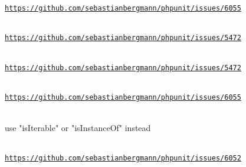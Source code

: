 \begin{DoxyRefList}
\label{deprecated__deprecated000288}%
%
\href{https://github.com/sebastianbergmann/phpunit/issues/6055}{\texttt{https\+://github.\+com/sebastianbergmann/phpunit/issues/6055}}  
\item[Global \doxylink{class_p_h_p_unit_1_1_framework_1_1_assert_a60343b0763f808380a0d6ae669ede96e}{Assert\+::assert\+String\+Not\+Matches\+Format} (string \$format, string \$string, string \$message=\textquotesingle{}\textquotesingle{})]\hfill \\
\label{deprecated__deprecated000289}%
%
\href{https://github.com/sebastianbergmann/phpunit/issues/5472}{\texttt{https\+://github.\+com/sebastianbergmann/phpunit/issues/5472}}  
\item[Global \doxylink{class_p_h_p_unit_1_1_framework_1_1_assert_a2d7501729a15c4a790a9020a15fe5cad}{Assert\+::assert\+String\+Not\+Matches\+Format\+File} (string \$format\+File, string \$string, string \$message=\textquotesingle{}\textquotesingle{})]\hfill \\
\label{deprecated__deprecated000290}%
%
\href{https://github.com/sebastianbergmann/phpunit/issues/5472}{\texttt{https\+://github.\+com/sebastianbergmann/phpunit/issues/5472}}  
\item[Global \doxylink{class_p_h_p_unit_1_1_framework_1_1_assert_a8d25447129d11edcbf91f80c7d82cae2}{Assert\+::contains\+Only} (string \$type)]\hfill \\
\label{deprecated__deprecated000291}%
%
\href{https://github.com/sebastianbergmann/phpunit/issues/6055}{\texttt{https\+://github.\+com/sebastianbergmann/phpunit/issues/6055}}  
\item[Global \doxylink{class_webmozart_1_1_assert_1_1_assert_a3c578fe4df71e6258b16f41ed3c8edc8}{Assert\+::is\+Traversable} (\$value, \$message=\textquotesingle{}\textquotesingle{})]\hfill \\
\label{deprecated__deprecated000443}%
%
use "{}is\+Iterable"{} or "{}is\+Instance\+Of"{} instead 
\item[Global \doxylink{class_p_h_p_unit_1_1_framework_1_1_assert_a9f01b36b8494d8848d90022057da9d87}{Assert\+::is\+Type} (string \$type)]\hfill \\
\label{deprecated__deprecated000292}%
%
\href{https://github.com/sebastianbergmann/phpunit/issues/6052}{\texttt{https\+://github.\+com/sebastianbergmann/phpunit/issues/6052}}  

\end{DoxyRefList}
